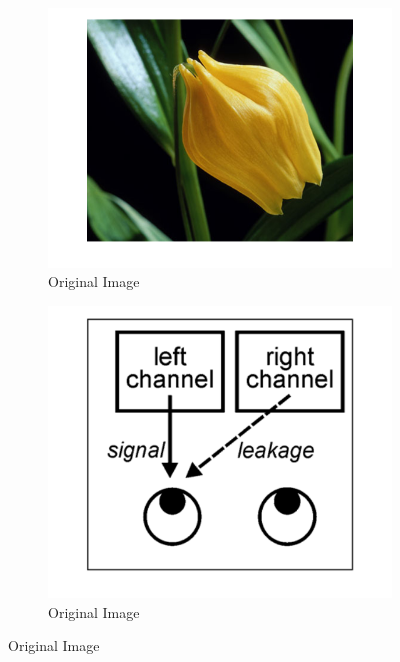\begin{figure}[htbp]

    \begin{subfigure}[b]{0.3\textwidth}
        \includegraphics[width=\textwidth]{./Template_Figures/orig}
        \caption{Original Image}\label{fig:originalPicture}
    \end{subfigure}
    \begin{subfigure}[b]{0.3\textwidth}
        \includegraphics[width=\textwidth]{./Template_Figures/leakage}
        \caption{Original Image}\label{fig:ill_leackage}
    \end{subfigure}

\end{figure}
